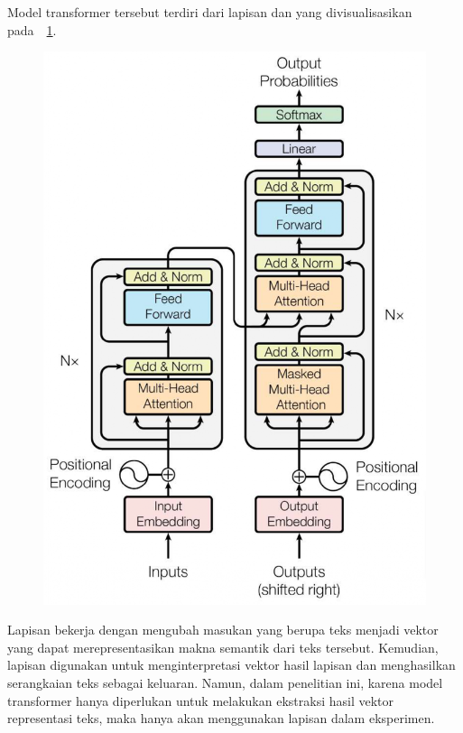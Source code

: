 Model transformer tersebut terdiri dari lapisan \encoder{} dan \decoder{} yang divisualisasikan pada~\gambar{}~\ref{fig:ilustrasi transformer}.
\begin{figure}[!ht]
    \centering
    \includegraphics[scale=0.4]{assets/pdfs/transformer_aristektur.pdf}
    \label{fig:ilustrasi transformer}
\end{figure}
Lapisan \encoder{} bekerja dengan mengubah masukan yang berupa teks menjadi vektor yang dapat merepresentasikan makna semantik dari teks tersebut. Kemudian, lapisan \decoder{} digunakan untuk menginterpretasi vektor hasil lapisan \encoder{} dan menghasilkan serangkaian teks sebagai keluaran. Namun, dalam penelitian ini, karena model transformer hanya diperlukan untuk melakukan ekstraksi hasil vektor representasi teks, maka hanya akan menggunakan lapisan \encoder{} dalam eksperimen.

